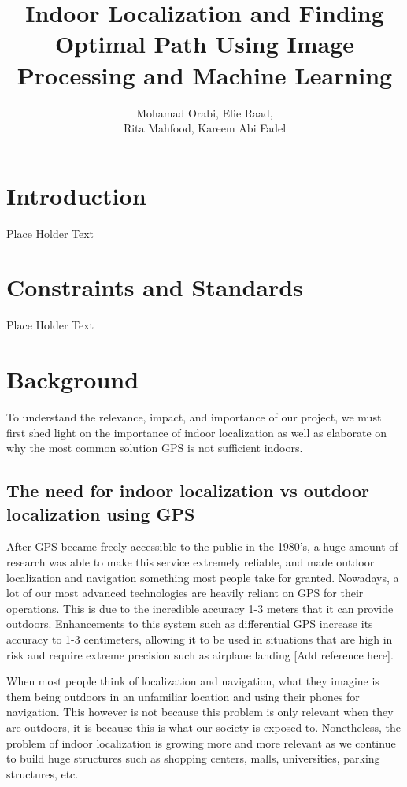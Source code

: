 \documentclass{article}
\title{Indoor Localization and Finding Optimal Path Using Image Processing and Machine Learning}
\author{Mohamad Orabi, Elie Raad, \\Rita Mahfood, Kareem Abi Fadel}
\begin{document}
\maketitle
\pagebreak

\tableofcontents
\pagebreak

\section{Introduction}
Place Holder Text
\section{Constraints and Standards}
Place Holder Text

\section{Background}
To understand the relevance, impact, and importance of our project, we must first shed light on the importance of indoor localization as well as elaborate on why the most common solution GPS is not sufficient indoors.

\subsection{The need for indoor localization vs outdoor localization using GPS}
After GPS became freely accessible to the public in the 1980's, a huge amount of research was able to make this service extremely reliable, and made outdoor localization and navigation something most people take for granted. Nowadays, a lot of our most advanced technologies are heavily reliant on GPS for their operations. This is due to the incredible accuracy 1-3 meters that it can provide outdoors. Enhancements to this system such as differential GPS increase its accuracy to 1-3 centimeters, allowing it to be used in situations that are high in risk and require extreme precision such as airplane landing [Add reference here]. 
\newline
 
When most people think of localization and navigation, what they imagine is them being outdoors in an unfamiliar location and using their phones for navigation. This however is not because this problem is only relevant when they are outdoors, it is because this is what our society is exposed to. Nonetheless, the problem of indoor localization is growing more and more relevant as we continue to build huge structures such as shopping centers, malls, universities, parking structures, etc.
\end{document}
